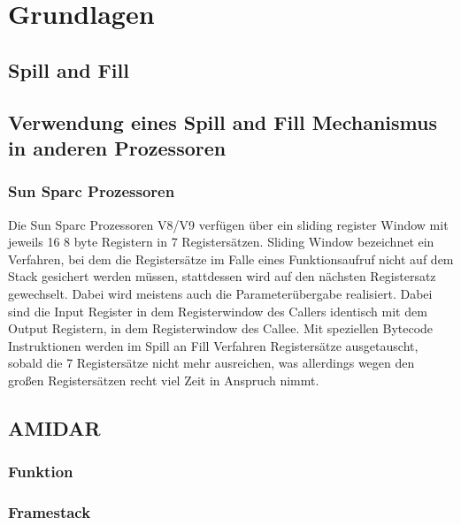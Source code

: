 \chapter{Grundlagen}
\label{cha:Grundlagen}

\section{Spill and Fill}
\section{Verwendung eines Spill and Fill Mechanismus in anderen Prozessoren}
\subsection{Sun Sparc Prozessoren}
Die Sun Sparc Prozessoren V8/V9 verfügen über ein sliding register Window mit jeweils 16 8 byte Registern in 7 Registersätzen. Sliding Window bezeichnet ein Verfahren, bei dem die Registersätze im Falle eines Funktionsaufruf nicht auf dem Stack gesichert werden müssen, stattdessen wird auf den nächsten Registersatz gewechselt. Dabei wird meistens auch die Parameterübergabe realisiert. Dabei sind die Input Register in dem Registerwindow des Callers identisch mit dem Output Registern, in dem Registerwindow des Callee.   
Mit speziellen Bytecode Instruktionen werden im Spill an Fill Verfahren Registersätze ausgetauscht, sobald die 7 Registersätze nicht mehr ausreichen, was allerdings wegen den großen Registersätzen recht viel Zeit in Anspruch nimmt.
\section{AMIDAR}
\subsection{Funktion}
\subsection{Framestack}